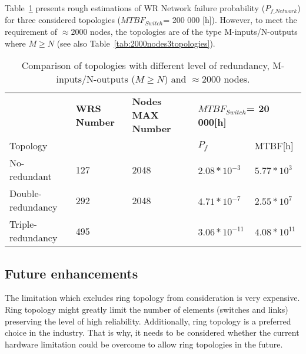 Table~\ref{tab:2000nodesReliability} presents rough estimations of WR Network
failure probability ($P_{f\_Network}$) for three considered topologies
($MTBF_{Switch}$= 200 000 [h]). However, to meet the requirement of $\approx
2000$ nodes, the topologies are of the type M-inputs/N-outputs where
$M \geq N$ (see also Table~\ref{tab:2000nodes3topologies}).

\begin{table}[ht]
\caption{Comparison of topologies with different level of redundancy,
M-inputs/N-outputs ($M \geq N$) and $\approx 2000$ nodes.}
\centering
\begin{tabular}{|p{4cm}|p{2cm}|p{2cm}|p{2.5cm}|p{2.5cm}|}        \hline
& \textbf{WRS Number} &
\textbf{Nodes MAX Number} &  
\multicolumn{2}{|p{5cm}|}{\textbf{$MTBF_{Switch}$=  20 000[h] }} \\
Topology & & & $P_f$ & MTBF[h]  \\ \hline

No-redundant &  127 &  2048  
& $ 2.08*10^{-3}$  & $ 5.77*10^{3}$
 \\ \hline

Double-redundancy &  292 &  2048  
& $ 4.71*10^{-7}$  &  $ 2.55*10^{7}$
   \\ \hline

Triple-redundancy &  495  &     
& $ 3.06*10^{-11}$  &  $ 4.08*10^{11}$
  \\ \hline
\end{tabular}
\label{tab:2000nodesReliability}
\end{table}

\subsection{Future enhancements}

The limitation which excludes ring topology from consideration is very
expensive. Ring topology might greatly limit the number of elements (switches
and links) preserving the level of high reliability. Additionally, ring topology
is a preferred choice in the industry. That is why, it needs to be considered
whether the current hardware limitation could be overcome to allow ring
topologies in the future.

\vspace{0.25cm}
